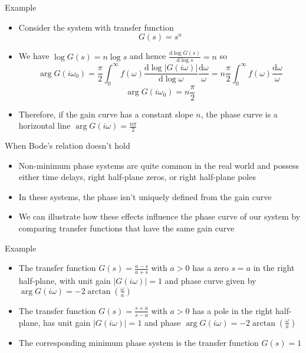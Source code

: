 \documentclass{beamer-control}
\begin{document}
\begin{frame}{Example}
\begin{itemize}
	\item Consider the system with transfer function 
	\[G(s)=s^n\]
	\item We have $\log G(s) = n\log s$ and hence $\tfrac{\mathrm{d}\log G(s)}{\mathrm{d} \log s}=n$ so
	\[\operatorname{arg}G(i\omega_0) = \frac{\pi}{2}\int^\infty_0 f(\omega) \frac{\mathrm{d}\log |G(i\omega)|}{\mathrm{d}\log \omega} \frac{\mathrm{d}\omega}{\omega}=n\frac{\pi}{2}\int^\infty_0 f(\omega)  \frac{\mathrm{d}\omega}{\omega}\]
	\[\operatorname{arg}G(i\omega_0) = n\frac{\pi}{2}\]
	\item Therefore, if the gain curve has a constant slope $n$, the phase curve is a horizontal line $\operatorname{arg}G(i\omega)=\tfrac{n\pi}{2}$
\end{itemize}
\end{frame}


\begin{frame}{When Bode's relation doesn't hold}
\begin{itemize}
\item Non-minimum phase systems are quite common in the real world and possess either time delays, right half-plane zeros, or right half-plane poles
\item In these systems, the phase isn't uniquely defined from the gain curve
\item We can illustrate how these effects influence the phase curve of our system by comparing transfer functions that have the same gain curve

\end{itemize}
\end{frame}

\begin{frame}{Example}
\begin{itemize}
	\item The transfer function $G(s)=\frac{a-s}{a+s}$ with $a>0$ has a zero $s=a$ in the right half-plane, with unit gain $|G(i\omega)|=1$ and phase curve given by $\operatorname{arg} G(i\omega) = -2\arctan (\tfrac{\omega}{a})$
	\item The transfer function $G(s)=\frac{s+a}{s-a}$ with $a>0$ has a pole in the right half-plane, has unit gain $|G(i\omega)|=1$ and phase  $\operatorname{arg} G(i\omega) = -2\arctan (\tfrac{\omega}{a})$
	\item The corresponding minimum phase system is the transfer function $G(s)=1$
\end{itemize}
\end{frame}
\end{document}
